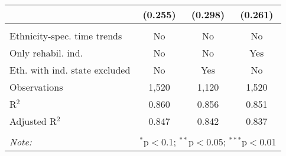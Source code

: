 \begin{table}[!h]
\begin{tabular}{@{\extracolsep{5pt}}lccc}
  & (0.255) & (0.298) & (0.261) \\ 
 \hline \\[-1.8ex] 
Ethnicity-spec. time trends & No & No & No \\ 
Only rehabil. ind. & No & No & Yes \\ 
Eth. with ind. state excluded & No & Yes & No \\ 
Observations & 1,520 & 1,120 & 1,520 \\ 
R$^{2}$ & 0.860 & 0.856 & 0.851 \\ 
Adjusted R$^{2}$ & 0.847 & 0.842 & 0.837 \\ 
\hline 
\hline \\[-1.8ex] 
\textit{Note:}  & \multicolumn{3}{r}{$^{*}$p$<$0.1; $^{**}$p$<$0.05; $^{***}$p$<$0.01} \\ 
\end{tabular} 
\end{table} 
